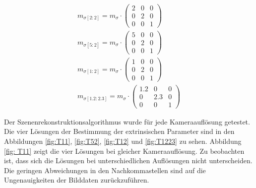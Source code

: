 \begin{gather}
	m_{\sigma[2:2]}=
	m_\sigma \cdot
	\begin{pmatrix}
2&0&0\\
0&2&0\\
0&0&1	
	\end{pmatrix}\\
	m_{\sigma[5:2]}=
m_\sigma \cdot
\begin{pmatrix}
	5&0&0\\
	0&2&0\\
	0&0&1	
\end{pmatrix}\\
	m_{\sigma[1:2]}=
m_\sigma \cdot
\begin{pmatrix}
	1&0&0\\
	0&2&0\\
	0&0&1	
\end{pmatrix}\\
	m_{\sigma[1.2:2.3]}=
m_\sigma \cdot
\begin{pmatrix}
	1.2&0&0\\
	0&2.3&0\\
	0&0&1	
\end{pmatrix}
\end{gather}


Der Szenenrekonstruktionsalgorithmus wurde für jede Kameraauflösung getestet. Die vier Lösungen der Bestimmung der extrinsischen Parameter sind in den Abbildungen \ref{fig:T11}, \ref{fig:T52}, \ref{fig:T12} und \ref{fig:T1223} zu sehen. Abbildung \ref{fig: T11} zeigt die vier Lösungen bei gleicher Kameraauflösung. Zu beobachten ist, dass sich die Lösungen bei unterschiedlichen Auflösungen nicht unterscheiden. Die geringen Abweichungen in den Nachkommastellen sind auf die Ungenauigkeiten der Bilddaten zurückzuführen.

%
%


